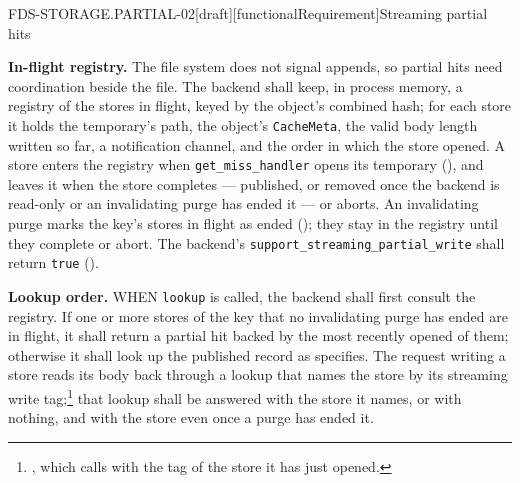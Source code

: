 \begin{requirement}{FDS-STORAGE.PARTIAL-02}[draft][functionalRequirement]{Streaming partial hits}


  \textbf{In-flight registry.} The file system does not signal appends, so
  partial hits need coordination beside the file. The backend shall keep, in
  process memory, a registry of the stores in flight, keyed by the object's
  combined hash; for each store it holds the temporary's path, the object's
  \texttt{CacheMeta}, the valid body length written so far, a notification
  channel, and the order in which the store opened. A store enters the
  registry when \texttt{get\_miss\_handler} opens its temporary
  (), and
  leaves it when the store completes
  --- published, or removed once the backend is read-only or an invalidating
  purge has ended it --- or aborts. An invalidating purge marks the key's
  stores in flight as ended (); they stay in the
  registry until they complete or abort. The
  backend's \texttt{support\_streaming\_partial\_write}
  shall return \texttt{true} ().

  \textbf{Lookup order.} WHEN \texttt{lookup} is called, the backend shall
  first consult the registry. If one or more stores of the key that no
  invalidating purge has ended are in flight, it shall return a partial hit
  backed by the most recently opened of them; otherwise it shall look up the
  published record as  specifies. The
  request writing a store reads its body back through a lookup that names
  the store by its streaming write
  tag;\footnote{,
  which 
  calls with the tag of the store it has just opened.} that lookup shall be
  answered with the store it names, or with nothing, and with the store even
  once a purge has ended it.


\end{requirement}
